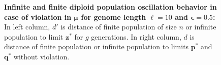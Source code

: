 \begin{figure}[h]
\begin{center}
\hspace{-3em}%
\vspace{-0.5em}  \hspace{-3em}%


\caption[\textbf{Infinite and finite diploid population oscillation behavior in case of violation in $\bm{\mu}$ for genome length $\ell = 10$ and $\bm{\epsilon} = 0.5$}]{\textbf{Infinite and finite diploid population oscillation behavior in case of violation in $\bm{\mu}$ for genome length $\ell = 10$ and $\bm{\epsilon} = 0.5$:} 
  In left column, $d'$ is distance of finite population of size $n$ or infinite population to limit $\bm{z}^\ast$ for $g$ generations. In right column, $d$ is distance of finite population or infinite population to limits $\bm{p}^\ast$ and $\bm{q}^\ast$ without violation.}
\label{oscillation_10d_vio_mu_0.5}
\end{center}
\end{figure}

